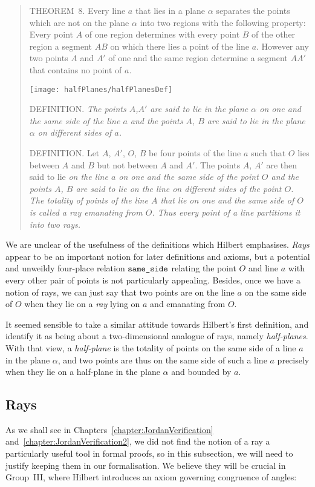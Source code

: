 \begin{quotation}
THEOREM~8. Every line $a$ that lies in a plane $\alpha$ separates the points which are not on the plane $\alpha$ into two regions with the following property: Every point $A$ of one region determines with every point $B$ of the other region a segment $AB$ on which there lies a point of the line $a$. However any two points $A$ and $A'$ of one and the same region determine a segment $AA'$ that contains no point of $a$.

\begin{center}\texttt{[image: halfPlanes/halfPlanesDef]}\end{center}

DEFINITION. \emph{The points $A$,$A'$ are said to lie in the plane $\alpha$ on one and the same side of the line $a$ and the points $A$, $B$ are said to lie in the plane $\alpha$ on different sides of $a$.}

DEFINITION. Let $A$, $A'$, $O$, $B$ be four points of the line $a$ such that $O$ lies between $A$ and $B$ but not between $A$ and $A'$. The points $A$, $A'$ are then said to lie \emph{on the line $a$ on one and the same side of the point $O$ and the points $A$, $B$ are said to lie on the line on different sides of the point $O$. The totality of points of the line $A$ that lie on one and the same side of $O$ is called a \emph{ray} emanating from $O$. Thus every point of a line partitions it into two rays.}
\end{quotation}

We are unclear of the usefulness of the definitions which Hilbert emphasises. \emph{Rays} appear to be an important notion for later definitions and axioms, but a potential and unweildy four-place relation $\texttt{same\_side}$
relating the point $O$ and line $a$ with every other pair of points is not particularly appealing. Besides, once we have a notion of rays, we can just say that two points are on the line $a$ on the same side of $O$ when they lie on a \emph{ray} lying on $a$ and emanating from $O$.

It seemed sensible to take a similar attitude towards Hilbert's first definition, and identify it as being about a two-dimensional analogue of rays, namely \emph{half-planes}. With that view, a \emph{half-plane} is the totality of points on the same side of a line $a$ in the plane $\alpha$, and two points are thus on the same side of such a line $a$ precisely when they lie on a half-plane in the plane $\alpha$ and bounded by $a$.

\subsection{Rays}
As we shall see in Chapters~\ref{chapter:JordanVerification} and~\ref{chapter:JordanVerification2}, we did not find the notion of a ray a particularly useful tool in formal proofs, so in this subsection, we will need to justify keeping them in our formalisation. We believe they will be crucial in Group~III, where Hilbert introduces an axiom governing congruence of angles:

